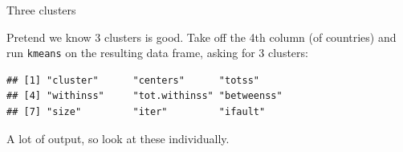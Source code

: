 \documentclass[ignorenonframetext,]{beamer}
\newenvironment{Shaded}{\begin{snugshade}}{\end{snugshade}}
\newcommand{\DecValTok}[1]{\textcolor[rgb]{0.00,0.00,0.81}{#1}}
\newcommand{\KeywordTok}[1]{\textcolor[rgb]{0.13,0.29,0.53}{\textbf{#1}}}
\newcommand{\NormalTok}[1]{#1}
\newcommand{\OperatorTok}[1]{\textcolor[rgb]{0.81,0.36,0.00}{\textbf{#1}}}
\newcommand{\StringTok}[1]{\textcolor[rgb]{0.31,0.60,0.02}{#1}}
\begin{document}
\begin{frame}[fragile]{Three clusters}
\protect\hypertarget{three-clusters}{}

Pretend we know 3 clusters is good. Take off the 4th column (of
countries) and run \texttt{kmeans} on the resulting data frame, asking
for 3 clusters:

\begin{Shaded}
\end{Shaded}

\begin{verbatim}
## [1] "cluster"      "centers"      "totss"       
## [4] "withinss"     "tot.withinss" "betweenss"   
## [7] "size"         "iter"         "ifault"
\end{verbatim}

A lot of output, so look at these individually.

\end{frame}
\end{document}

